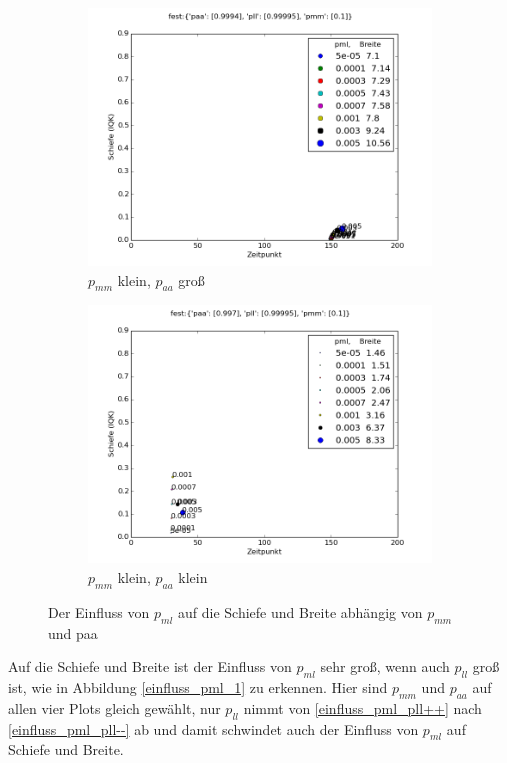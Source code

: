 \begin{figure}
\begin{subfigure}[b]{0.5\textwidth}
\includegraphics[width=\textwidth]{bilder/pml/pml_01_p_09994_099995}
\caption{$p_{mm}$ klein, $p_{aa}$ groß}
\end{subfigure}
\begin{subfigure}[b]{0.5\textwidth}
\includegraphics[width=\textwidth]{bilder/pml/pml_01_p_0997_099995}
\caption{$p_{mm}$ klein, $p_{aa}$ klein}
\end{subfigure}
\caption{Der Einfluss von $p_{ml}$ auf die Schiefe und Breite abhängig von $p_{mm}$ und paa}
\label{einfluss_pml_2}
\end{figure}

Auf die Schiefe und Breite ist der Einfluss von $p_{ml}$ sehr groß, wenn auch $p_{ll}$ groß ist, wie in Abbildung \ref{einfluss_pml_1} zu erkennen. Hier sind $p_{mm}$ und $p_{aa}$ auf allen vier Plots gleich gewählt, nur $p_{ll}$ nimmt von \ref{einfluss_pml_pll++} nach \ref{einfluss_pml_pll--} ab und damit schwindet auch der Einfluss von $p_{ml}$ auf Schiefe und Breite.

